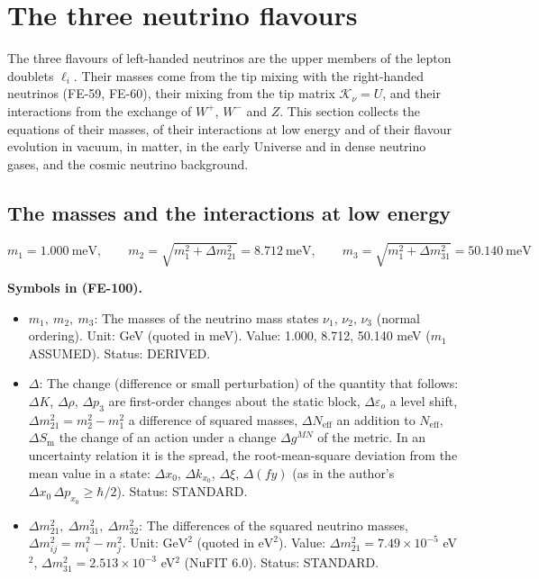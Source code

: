 \documentclass[
  10pt,
]{article}
\providecommand{\tightlist}{%
  \setlength{\itemsep}{0pt}\setlength{\parskip}{0pt}}
\begin{document}
\hypertarget{the-three-neutrino-flavours}{%
\section{The three neutrino
flavours}\label{the-three-neutrino-flavours}}

The three flavours of left-handed neutrinos are the upper members of the
lepton doublets \(\ell_i\). Their masses come from the tip mixing with
the right-handed neutrinos (FE-59, FE-60), their mixing from the tip
matrix \(\mathcal{K}_\nu = U\), and their interactions from the exchange
of \(W^+\), \(W^-\) and \(Z\). This section collects the equations of
their masses, of their interactions at low energy and of their flavour
evolution in vacuum, in matter, in the early Universe and in dense
neutrino gases, and the cosmic neutrino background.

\hypertarget{the-masses-and-the-interactions-at-low-energy}{%
\subsection{The masses and the interactions at low
energy}\label{the-masses-and-the-interactions-at-low-energy}}

\[
m_1 = 1.000\ \text{meV},\qquad m_2 = \sqrt{m_1^2 + \Delta m_{21}^2} = 8.712\ \text{meV},\qquad
m_3 = \sqrt{m_1^2 + \Delta m_{31}^2} = 50.140\ \text{meV} \tag{FE-100}
\]

\textbf{Symbols in (FE-100).}

\begin{itemize}
\tightlist
\item
  \(m_1,\ m_2,\ m_3\): The masses of the neutrino mass states \(\nu_1\),
  \(\nu_2\), \(\nu_3\) (normal ordering). Unit: GeV (quoted in meV).
  Value: 1.000, 8.712, 50.140 meV (\(m_1\) ASSUMED). Status: DERIVED.
\item
  \(\Delta\): The change (difference or small perturbation) of the
  quantity that follows: \(\Delta K\), \(\Delta\rho\), \(\Delta p_3\)
  are first-order changes about the static block,
  \(\Delta\varepsilon_o\) a level shift,
  \(\Delta m^2_{21} = m_2^2 - m_1^2\) a difference of squared masses,
  \(\Delta N_{\mathrm{eff}}\) an addition to \(N_{\mathrm{eff}}\),
  \(\Delta S_{\mathrm{m}}\) the change of an action under a change
  \(\Delta g^{MN}\) of the metric. In an uncertainty relation it is the
  spread, the root-mean-square deviation from the mean value in a state:
  \(\Delta x_0\), \(\Delta k_{x_0}\), \(\Delta\xi\), \(\Delta(fy)\) (as
  in the author's \(\Delta x_0\,\Delta p_{x_0} \ge \hbar/2\)). Status:
  STANDARD.
\item
  \(\Delta m_{21}^2,\ \Delta m_{31}^2,\ \Delta m_{32}^2\): The
  differences of the squared neutrino masses,
  \(\Delta m_{ij}^2 = m_i^2 - m_j^2\). Unit: \(\mathrm{GeV}^{2}\)
  (quoted in \(\mathrm{eV}^{2}\)). Value:
  \(\Delta m_{21}^2 = 7.49\times10^{-5}\) eV\(^2\),
  \(\Delta m_{31}^2 = 2.513\times10^{-3}\) eV\(^2\) (NuFIT 6.0). Status:
  STANDARD.
\end{itemize}
\end{document}

